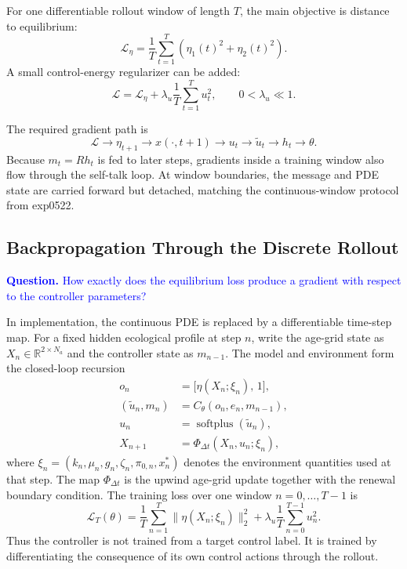 \documentclass[11pt]{article}
\newcommand{\R}{\mathbb{R}}
\newcommand{\softplus}{\operatorname{softplus}}
\newcommand{\bluequestion}[1]{\textcolor{blue}{\textbf{Question.} #1}}
\begin{document}
For one differentiable rollout window of length \(T\), the main objective
is distance to equilibrium:
\begin{equation}
  \mathcal L_\eta
  =
  \frac{1}{T}
  \sum_{t=1}^{T}
  \left(
    \eta_1(t)^2+\eta_2(t)^2
  \right).
  \label{eq:eta-loss}
\end{equation}
A small control-energy regularizer can be added:
\begin{equation}
  \mathcal L
  =
  \mathcal L_\eta
  +
  \lambda_u
  \frac{1}{T}
  \sum_{t=1}^{T}
  u_t^2,
  \qquad
  0<\lambda_u\ll 1.
  \label{eq:total-loss}
\end{equation}

The required gradient path is
\[
  \mathcal L
  \to
  \eta_{t+1}
  \to
  x(\cdot,t+1)
  \to
  u_t
  \to
  \tilde u_t
  \to
  h_t
  \to
  \theta.
\]
Because \(m_t=Rh_t\) is fed to later steps, gradients inside a training
window also flow through the self-talk loop. At window boundaries, the
message and PDE state are carried forward but detached, matching the
continuous-window protocol from exp0522.

\subsection*{Backpropagation Through the Discrete Rollout}

\bluequestion{How exactly does the equilibrium loss produce a gradient
with respect to the controller parameters?}

In implementation, the continuous PDE is replaced by a differentiable
time-step map. For a fixed hidden ecological profile at step \(n\), write
the age-grid state as \(X_n\in\R^{2\times N_a}\) and the controller state
as \(m_{n-1}\). The model and environment form the closed-loop recursion
\begin{align}
  o_n
  &=
  \big[\eta(X_n;\xi_n),\,1\big],
  \\
  (\tilde u_n,m_n)
  &=
  C_\theta(o_n,e_n,m_{n-1}),
  \\
  u_n
  &=
  \softplus(\tilde u_n),
  \\
  X_{n+1}
  &=
  \Phi_{\Delta t}(X_n,u_n;\xi_n),
  \label{eq:closed-loop-discrete-map}
\end{align}
where \(\xi_n=(k_n,\mu_n,g_n,\zeta_n,\pi_{0,n},x_n^*)\) denotes the
environment quantities used at that step. The map
\(\Phi_{\Delta t}\) is the upwind age-grid update together with the
renewal boundary condition. The training loss over one window
\(n=0,\ldots,T-1\) is
\begin{equation}
  \mathcal L_T(\theta)
  =
  \frac{1}{T}
  \sum_{n=1}^{T}
  \|\eta(X_n;\xi_n)\|_2^2
  +
  \lambda_u
  \frac{1}{T}
  \sum_{n=0}^{T-1}
  u_n^2 .
  \label{eq:window-loss}
\end{equation}
Thus the controller is not trained from a target control label. It is
trained by differentiating the consequence of its own control actions
through the rollout.
\end{document}
